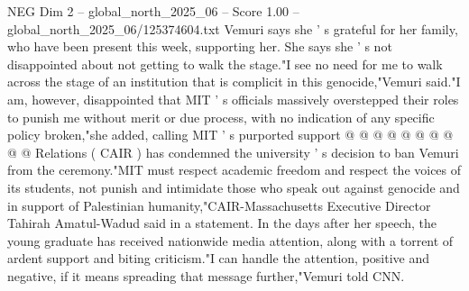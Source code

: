 \begin{textsample}{NEG Dim 2 – global\_north\_2025\_06 – Score 1.00 – global\_north\_2025\_06/125374604.txt}
Vemuri says she ' s grateful for her family, who have been present this week, supporting her.
She says she ' s not disappointed about not getting to walk the stage."I see no need for me to walk across the stage of an institution that is complicit in this genocide,"Vemuri said."I am, however, disappointed that MIT ' s officials massively overstepped their roles to punish me without merit or due process, with no indication of any specific policy broken,"she added, calling MIT ' s purported support @ @ @ @ @ @ @ @ @ @ Relations ( CAIR ) has condemned the university ' s decision to ban Vemuri from the ceremony."MIT must respect academic freedom and respect the voices of its students, not punish and intimidate those who speak out against genocide and in support of Palestinian humanity,"CAIR-Massachusetts Executive Director Tahirah Amatul-Wadud said in a statement.
In the days after her speech, the young graduate has received nationwide media attention, along with a torrent of ardent support and biting criticism."I can handle the attention, positive and negative, if it means spreading that message further,"Vemuri told CNN.

\end{textsample}
